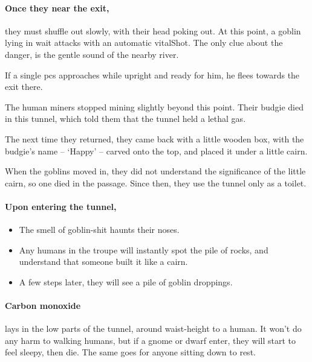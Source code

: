 \begin{multicols}{2}
\paragraph{Once they near the exit,}
they must shuffle out slowly, with their head poking out.
At this point, a goblin lying in wait attacks with an automatic \gls{vitalShot}.
The only clue about the danger, is the gentle sound of the nearby river.

If a single \glspl{pc} approaches while upright and ready for him, he flees towards the exit there.


\begin{exampletext}
  The human miners stopped mining slightly beyond this point.
  Their budgie died in this tunnel, which told them that the tunnel held a lethal gas.

  The next time they returned, they came back with a little wooden box, with the budgie's name -- `Happy' -- carved onto the top, and placed it under a little cairn.

  When the goblins moved in, they did not understand the significance of the little cairn, so one died in the passage.
  Since then, they use the tunnel only as a toilet.
\end{exampletext}

\paragraph{Upon entering the tunnel,}

\begin{itemize}
  \item
  The smell of goblin-shit haunts their noses.
  \item
  Any humans in the troupe will instantly spot the pile of rocks, and understand that someone built it like a cairn.
  \item
  A few \glspl{step} later, they will see a pile of goblin droppings.
\end{itemize}

\paragraph{Carbon monoxide}
lays in the low parts of the tunnel, around waist-height to a human.
It won't do any harm to walking humans, but if a gnome or dwarf enter, they will start to feel sleepy, then die.
The same goes for anyone sitting down to rest.


\end{multicols}
